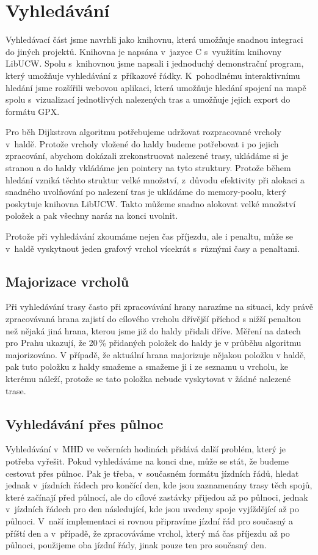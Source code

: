 \section{Vyhledávání}
\label{ch:implementace:vyhledavani}
Vyhledávací část jsme navrhli jako knihovnu, která umožňuje snadnou integraci do
jiných projektů. Knihovna je napsána v~jazyce C s~využitím knihovny LibUCW.
Spolu s~knihovnou jsme napsali i jednoduchý demonstrační program, který umožňuje
vyhledávání z~příkazové řádky. K~pohodlnému interaktivnímu hledání jsme
rozšířili webovou aplikaci, která umožňuje hledání spojení na mapě spolu
s~vizualizací jednotlivých nalezených tras a umožňuje jejich export do formátu
GPX.

Pro běh Dijkstrova algoritmu potřebujeme udržovat rozpracované vrcholy v~haldě.
Protože vrcholy vložené do haldy budeme potřebovat i po jejich zpracování,
abychom dokázali zrekonstruovat nalezené trasy, ukládáme si je stranou a do
haldy vkládáme jen pointery na tyto struktury. Protože během hledání vzniká
těchto struktur velké množství, z~důvodu efektivity při alokaci a snadného
uvolňování po nalezení tras je ukládáme do memory-poolu, který poskytuje
knihovna LibUCW. Takto můžeme snadno alokovat velké množství položek a pak
všechny naráz na konci uvolnit.

Protože při vyhledávání zkoumáme nejen čas příjezdu, ale i penaltu, může se
v~haldě vyskytnout jeden grafový vrchol vícekrát s~různými časy a penaltami.

\subsection{Majorizace vrcholů}
Při vyhledávání trasy často při zpracovávání hrany narazíme na situaci, kdy
právě zpracovávaná hrana zajistí do cílového vrcholu dřívější příchod s nižší
penaltou než nějaká jiná hrana, kterou jsme již do haldy přidali dříve. Měření
na datech pro Prahu ukazují, že 20\,\% přidaných položek do haldy je v průběhu
algoritmu majorizováno. V případě, že aktuální hrana majorizuje nějakou položku
v haldě, pak tuto položku z haldy smažeme a smažeme ji i ze seznamu u vrcholu,
ke kterému náleží, protože se tato položka nebude vyskytovat v žádné nalezené
trase.

\subsection{Vyhledávání přes půlnoc}
Vyhledávání v~MHD ve večerních hodinách přidává další problém, který je potřeba
vyřešit. Pokud vyhledáváme na konci dne, může se stát, že budeme cestovat přes
půlnoc. Pak je třeba, v~současném formátu jízdních řádů, hledat jednak
v~jízdních řádech pro končící den, kde jsou zaznamenány trasy těch spojů, které
začínají před půlnocí, ale do cílové zastávky přijedou až po půlnoci, jednak
v~jízdních řádech pro den následující, kde jsou uvedeny spoje vyjíždějící až po
půlnoci. V~naší implementaci si rovnou připravíme jízdní řád pro současný a
příští den a v~případě, že zpracováváme vrchol, který má čas příjezdu až po
půlnoci, použijeme oba jízdní řády, jinak pouze ten pro současný den.

